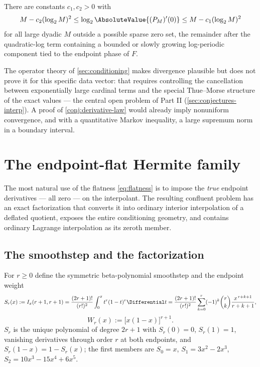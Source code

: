 \begin{conjecture}
\label{conj:derivative-law}
There are constants $c_1,c_2>0$ with
\begin{equation}
 M-c_2(\log_2M)^{2}
 \le\log_2\AbsoluteValue{(P_M)'(0)}
 \le M-c_1(\log_2M)^{2}
 \label{eq:derivative-conjecture}
\end{equation}
for all large dyadic $M$ outside a possible sparse zero set, the
remainder after the quadratic-log term containing a bounded or slowly
growing log-periodic component tied to the endpoint phase of $F$.
\end{conjecture}

The operator theory of \cref{sec:conditioning} makes divergence
plausible but does not prove it for this specific data vector: that
requires controlling the cancellation between exponentially large
cardinal terms and the special Thue--Morse structure of the exact
values --- the central open problem of Part II
(\cref{sec:conjectures-interp}).  A proof of
\cref{conj:derivative-law} would already imply nonuniform convergence,
and with a quantitative Markov inequality, a large supremum norm in a
boundary interval.

\section{The endpoint-flat Hermite family}
\label{sec:endpoint-flat}

The most natural use of the flatness \eqref{eq:flatness} is to impose
the \emph{true} endpoint derivatives --- all zero --- on the
interpolant.  The resulting confluent problem has an exact
factorization that converts it into ordinary interior interpolation of
a deflated quotient, exposes the entire conditioning geometry, and
contains ordinary Lagrange interpolation as its zeroth member.

\subsection{The smoothstep and the factorization}

For $r\ge0$ define the symmetric beta-polynomial smoothstep and the
endpoint weight
\begin{equation}
 S_r(x):=I_x(r+1,r+1)
 =\frac{(2r+1)!}{(r!)^{2}}\int_0^{x}t^{r}(1-t)^{r}\Differential t
 =\frac{(2r+1)!}{(r!)^{2}}
 \sum_{k=0}^{r}(-1)^{k}\binom rk\frac{x^{\,r+k+1}}{r+k+1},
 \label{eq:smoothstep}
\end{equation}
\begin{equation}
 W_r(x):=\bigl[x(1-x)\bigr]^{r+1}.
 \label{eq:Wr}
\end{equation}
$S_r$ is the unique polynomial of degree $2r+1$ with
$S_r(0)=0$, $S_r(1)=1$, vanishing derivatives through order $r$ at
both endpoints, and $S_r(1-x)=1-S_r(x)$; the first members are
$S_0=x$, $S_1=3x^2-2x^3$, $S_2=10x^3-15x^4+6x^5$.

